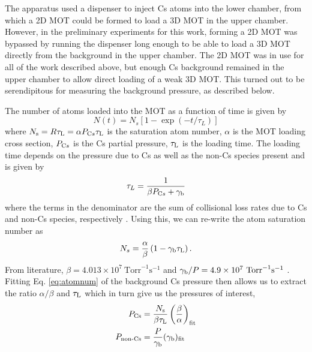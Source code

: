 The apparatus used a  dispenser to inject Cs atoms into the lower chamber, from which a 2D MOT could be formed to load a 3D MOT in the upper chamber. However, in the preliminary experiments for this work, forming a 2D MOT was bypassed by running the dispenser long enough to be able to load a 3D MOT directly from the background in the upper chamber. The 2D MOT was in use for all of the work described above, but enough Cs background remained in the upper chamber to allow direct loading of a weak 3D MOT. This turned out to be serendipitous for measuring the background pressure, as described below. 

The number of atoms loaded into the MOT as a function of time is given by
\begin{equation}\label{eq:atomnum}
N(t)=N_s\left[1-\exp \left(-t / \tau_L\right)\right]
\end{equation}
where $N_{\text s}=R \tau_{\text L}=\alpha P_{\text Cs} \tau_{\text L}$ is the saturation atom number, $\alpha$ is the MOT loading cross section, $P_{\text Cs}$ is the Cs partial pressure, $\tau_{\text L}$ is the loading time. The loading time depends on the pressure due to Cs as well as the non-Cs species present and is given by
\begin{equation}
\tau_L=\frac{1}{\beta P_{\text Cs}+\gamma_{\text b}}
\end{equation}
where the terms in the denominator are the sum of collisional loss rates due to Cs and non-Cs species, respectively \cite{RRCAT2020}. Using this, we can re-write the atom saturation number as 
\begin{equation}
N_s=\frac{\alpha}{\beta}\left(1-\gamma_{\text b} \tau_{\text L}\right).
\end{equation}
From literature, $\beta=4.013\times10^7 ~\text{Torr}^{-1} \text{s}^{-1}$ and $\gamma_{\text b}/P=4.9\times10^7 ~\text{Torr}^{-1} \text{s}^{-1}$ \cite{Arnthorp2012}. Fitting Eq. \ref{eq:atomnum} of the background Cs pressure then allows us to extract the ratio $\alpha/\beta$ and $\tau_{\text L}$ which in turn give us the pressures of interest, 
\begin{equation}\label{eq:background_pressures}
\begin{aligned}
    P_{\text {Cs}} &= \frac{N_{\text s}}{\beta \tau_{\text L}}\left(\frac{\beta}{\alpha}\right)_{\text {fit}}\\
    P_{\text {non-Cs}} &= \frac{P}{\gamma_{\text b}}(\gamma_{\text b})_{\text{fit}}
\end{aligned}
\end{equation}
